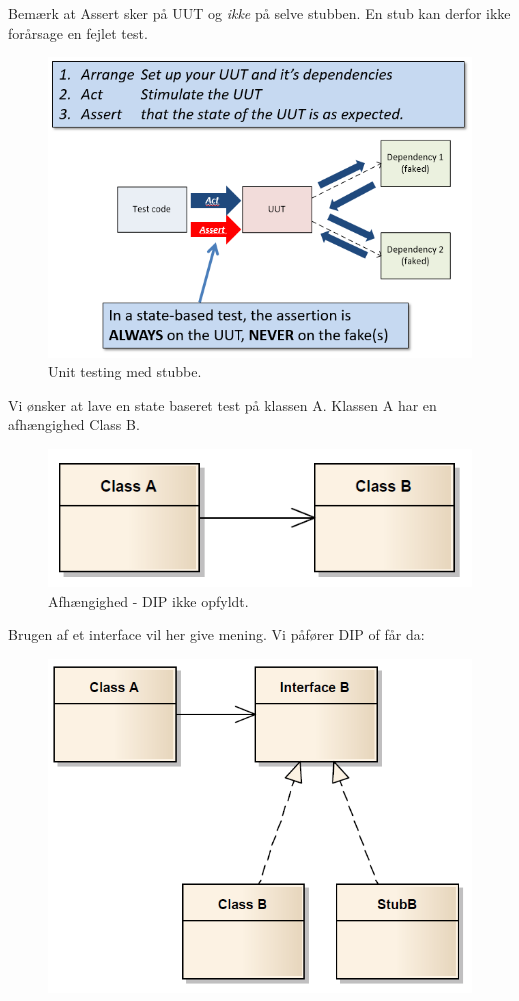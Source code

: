 Bemærk at Assert sker på UUT og \textit{ikke} på selve stubben. En stub kan derfor ikke forårsage en fejlet test.

\begin{figure}
	\centering
	\includegraphics[width=0.7\linewidth]{figs/stubTest.PNG}
	\caption{Unit testing med stubbe.}
	\label{fig:stubTest}
\end{figure}

Vi ønsker at lave en state baseret test på klassen A. Klassen A har en afhængighed Class B.

\begin{figure}[H]
	\centering
	\includegraphics[width=0.7\linewidth]{figs/stubNoInterface.PNG}
	\caption{Afhængighed - DIP ikke opfyldt.}
	\label{fig:stubNoInterface}
\end{figure}

Brugen af et interface vil her give mening. Vi påfører DIP of får da:

\begin{figure}[H]
	\centering
	\includegraphics[width=0.7\linewidth]{figs/stubInterface.PNG}
	\caption{}
	\label{fig:stubInterface}
\end{figure}

